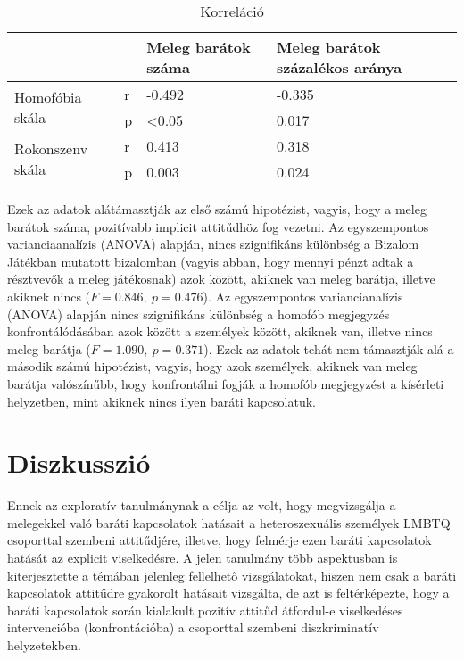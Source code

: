 \begin{table}[h]
		\centering
	\begin{tabular}{|l|l|l|l|}
		\hline
		&   & Meleg barátok száma & Meleg barátok százalékos aránya \\ \hline
		\multirow{2}{*}{Homofóbia skála}  & r & -0.492              & -0.335                          \\ \cline{2-4} 
		& p & \textless{}0.05     & 0.017                           \\ \hline
		\multirow{2}{*}{Rokonszenv skála} & r & 0.413               & 0.318                           \\ \cline{2-4} 
		& p & 0.003               & 0.024                           \\ \hline
	\end{tabular}
	\caption{Korreláció}
	\label{table:2}
\end{table}

Ezek az adatok alátámasztják az első számú hipotézist, vagyis, hogy a meleg barátok száma, pozitívabb implicit attitűdhöz fog vezetni. Az egyszempontos varianciaanalízis (ANOVA) alapján, nincs szignifikáns különbség a Bizalom Játékban mutatott bizalomban (vagyis abban, hogy mennyi pénzt adtak a résztvevők a meleg játékosnak) azok között, akiknek van meleg barátja, illetve akiknek nincs ($F=0.846, \ p=0.476$). Az egyszempontos variancianalízis (ANOVA) alapján nincs szignifikáns különbség a  homofób megjegyzés konfrontálódásában azok között a személyek között, akiknek van, illetve nincs meleg barátja ($F=1.090, \ p=0.371$). Ezek az adatok tehát nem támasztják alá a második számú hipotézist, vagyis, hogy azok személyek, akiknek van meleg barátja valószínűbb, hogy konfrontálni fogják a homofób megjegyzést a kísérleti helyzetben, mint akiknek nincs ilyen baráti kapcsolatuk. 

\section{Diszkusszió}
Ennek az exploratív tanulmánynak a célja az volt, hogy megvizsgálja a melegekkel való baráti kapcsolatok hatásait a heteroszexuális személyek LMBTQ csoporttal szembeni attitűdjére, illetve, hogy felmérje ezen baráti kapcsolatok hatását az explicit viselkedésre. A jelen tanulmány több aspektusban is kiterjesztette a témában jelenleg fellelhető vizsgálatokat, hiszen nem csak a baráti kapcsolatok attitűdre gyakorolt hatásait vizsgálta, de azt is feltérképezte, hogy a baráti kapcsolatok során kialakult pozitív attitűd átfordul-e viselkedéses intervencióba (konfrontációba) a csoporttal szembeni diszkriminatív helyzetekben.

